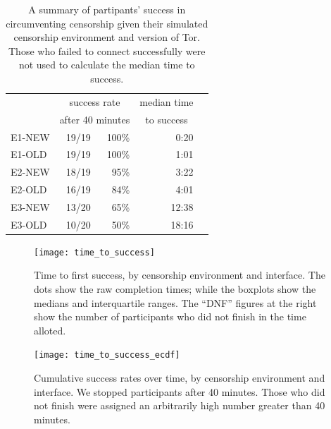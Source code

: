 \documentclass[USenglish,oneside,twocolumn]{article}
\begin{document}
\begin{table}
\centering
	\begin{tabular}{l r r r r}
	& \multicolumn{2}{c}{success rate} & \multicolumn{1}{c}{median time} \\
	& \multicolumn{2}{c}{after 40 minutes} & \multicolumn{1}{c}{to success} \\
	\noalign{\hrule}
	E1-NEW & 19/19 & 100\% & 0:20 \\
	E1-OLD & 19/19 & 100\% & 1:01 \\
	E2-NEW & 18/19 & 95\% & 3:22 \\
	E2-OLD & 16/19 & 84\% & 4:01 \\
	E3-NEW & 13/20 & 65\% & 12:38 \\
	E3-OLD & 10/20 & 50\% & 18:16 \\
	\end{tabular}
\caption{A summary of partipants' success in circumventing censorship
given their simulated censorship environment and version of Tor. Those who
failed to connect successfully were not used to calculate the median time
to success.}
\end{table}

\begin{figure}
\centering
\texttt{[image: time\_to\_success]}
\caption{
Time to first success, by censorship environment and interface.
The dots show the raw completion times;
while the boxplots show the medians and interquartile ranges.
The ``DNF'' figures at the right
show the number of participants who did not finish
in the time alloted.
}
\label{fig:time_to_success}
\end{figure}


\begin{figure}
\centering
\texttt{[image: time\_to\_success\_ecdf]}
\caption{
Cumulative success rates over time, by censorship environment and interface.
We stopped participants after 40 minutes. Those who did not finish were assigned
an arbitrarily high number greater than 40 minutes. 
}
\label{fig:time_to_success_ecdf}
\end{figure}
\end{document}
